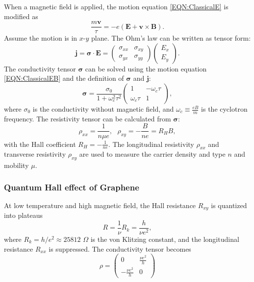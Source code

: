 \documentclass[pdflatex, sectionletters, 12pt]{pittetd}    %
\begin{document}
When a magnetic field is applied, the motion equation \ref{EQN:ClassicalE} is modified as 
\begin{equation}
\frac{m\mathbf{v}}{\tau} = -e(\mathbf{E} + \mathbf{v} \times \mathbf{B}).
\label{EQN:ClassicalEB}
\end{equation}
Assume the motion is in $x$-$y$ plane. The Ohm's law can be written as tensor form:
$$
\mathbf{j} = 
\mathbf{\sigma} \cdot \mathbf{E} =
\begin{pmatrix}
\sigma_{xx} & \sigma_{xy} \\
\sigma_{yx} & \sigma_{yy}
\end{pmatrix}
\begin{pmatrix}
E_{x} \\
E_{y}
\end{pmatrix}.
$$
The conductivity tensor $\mathbf{\sigma}$ can be solved using the motion equation \ref{EQN:ClassicalEB} and the definition of $\mathbf{\sigma}$ and $\mathbf{j}$:
$$
\mathbf{\sigma} = \frac{\sigma_0}{1 + \omega_c^2\tau^2}
\begin{pmatrix}
1 & -\omega_c\tau \\
\omega_c\tau & 1
\end{pmatrix},
$$
where $\sigma_0$ is the conductivity without magnetic field, and $\displaystyle \omega_c \equiv \frac{eB}{m}$ is the cyclotron frequency. The resistivity tensor can be calculated from $\mathbf{\sigma}$:
\begin{equation}
\rho_{xx} = \frac{1}{n\mu e}, \ \ \ \rho_{xy} = -\frac{B}{n e} = R_H B,
\label{EQN:Hall}
\end{equation}
with the Hall coefficient $\displaystyle R_H = -\frac{1}{ne}.$
The longitudinal resistivity $\rho_{xx}$ and transverse resistivity $\rho_{xy}$ are used to measure the carrier density and type $n$ and mobility $\mu$.

\subsubsection{Quantum Hall effect of Graphene}
\label{SEC:QuantumHall}

At low temperature and high magnetic field, the Hall resistance $R_{xy}$ is quantized into plateaus 
$$
R = \frac{1}{\nu}R_k = \frac{h}{\nu e^2},
$$
where $R_k = h/e^2 \approx 25812$ $\Omega$ is the von Klitzing constant, and the longitudinal resistance $R_{xx}$ is suppressed. The conductivity tensor becomes
$$ \displaystyle
\rho = 
\begin{pmatrix}
0 & \frac{\nu e^2}{h} \\ 
-\frac{\nu e^2}{h} & 0
\end{pmatrix}
$$
\end{document}
